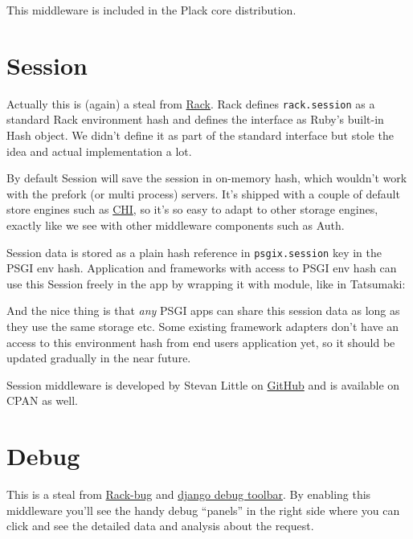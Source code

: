This middleware is included in the Plack core distribution.

\section{Session}\label{session}

Actually this is (again) a steal from
\href{http://rack.rubyforge.org/}{Rack}. Rack defines
\lstinline!rack.session! as a standard Rack environment hash and defines
the interface as Ruby's built-in Hash object. We didn't define it as
part of the standard interface but stole the idea and actual
implementation a lot.


By default Session will save the session in on-memory hash, which
wouldn't work with the prefork (or multi process) servers. It's shipped
with a couple of default store engines such as
\href{http://search.cpan.org/perldoc?CHI}{CHI}, so it's so easy to adapt
to other storage engines, exactly like we see with other middleware
components such as Auth.

Session data is stored as a plain hash reference in
\lstinline!psgix.session! key in the PSGI env hash. Application and
frameworks with access to PSGI env hash can use this Session freely in
the app by wrapping it with  module, like in Tatsumaki:


And the nice thing is that \emph{any} PSGI apps can share this session
data as long as they use the same storage etc. Some existing framework
adapters don't have an access to this environment hash from end users
application yet, so it should be updated gradually in the near future.

Session middleware is developed by Stevan Little on
\href{http://github.com/stevan/plack-middleware-session}{GitHub} and is
available on CPAN as well.

\section{Debug}\label{debug}

This is a steal from \href{http://github.com/brynary/rack-bug}{Rack-bug}
and \href{http://github.com/robhudson/django-debug-toolbar}{django debug
toolbar}. By enabling this middleware you'll see the handy debug
``panels'' in the right side where you can click and see the detailed
data and analysis about the request.

